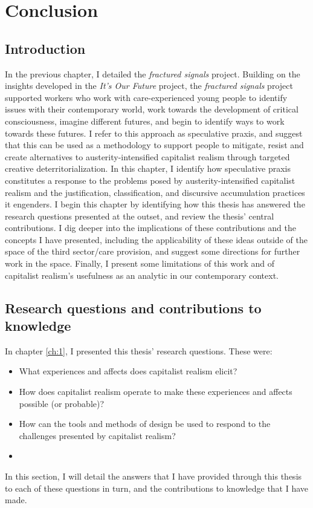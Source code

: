 \chapter{Conclusion}
\label{ch:9}

\section{Introduction}
\label{sec:}
In the previous chapter, I detailed the \textit{fractured signals} project. Building on the insights developed in the \emph{It's Our Future} project, the \emph{fractured signals} project supported workers who work with care-experienced young people to identify issues with their contemporary world, work towards the development of critical consciousness, imagine different futures, and begin to identify ways to work towards these futures. I refer to this approach as speculative praxis, and suggest that this can be used as a methodology to support people to mitigate, resist and create alternatives to austerity-intensified capitalist realism through targeted creative deterritorialization. In this chapter, I identify how speculative praxis constitutes a response to the problems posed by austerity-intensified capitalist realism and the justification, classification, and discursive accumulation practices it engenders. I begin this chapter by identifying how this thesis has answered the research questions presented at the outset, and review the thesis' central contributions. I dig deeper into the implications of these contributions and the concepts I have presented, including the applicability of these ideas outside of the space of the third sector/care provision, and suggest some directions for further work in the space. Finally, I present some limitations of this work and of capitalist realism's usefulness as an analytic in our contemporary context.

\section{Research questions and contributions to knowledge}
In chapter \ref{ch:1}, I presented this thesis' research questions. These were:
\begin{itemize}
    \item What experiences and affects does capitalist realism elicit?
    \item How does capitalist realism operate to make these experiences and affects possible (or probable)?
    \item How can the tools and methods of design be used to respond to the challenges presented by capitalist realism?
    \item \end{itemize}
In this section, I will detail the answers that I have provided through this thesis to each of these questions in turn, and the contributions to knowledge that I have made.


